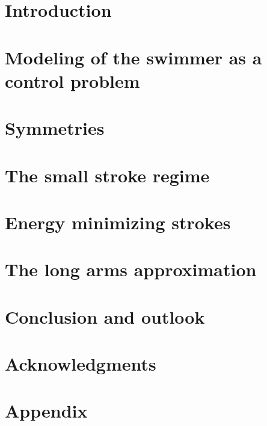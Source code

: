 \documentclass[10pt,a4paper]{article}
\numberwithin{equation}{section}
\theoremstyle{plain}
\theoremstyle{plain}
\theoremstyle{plain}
\theoremstyle{remark}
\theoremstyle{definition}
\theoremstyle{definition}
\theoremstyle{plain}
\theoremstyle{plain}
\begin{document}
\newpage

\tableofcontents

\newpage

\section{Introduction}


\section[Modeling]{Modeling of the swimmer as a control problem}


\section{Symmetries}


\section[The small strokes regime]{The small stroke regime}


\section{Energy minimizing strokes}


\section{The long arms approximation}



\section{Conclusion and outlook}
%

\section{Acknowledgments}


\newpage
\section{Appendix}



\printbibliography[title = Bibliography]
\end{document}
